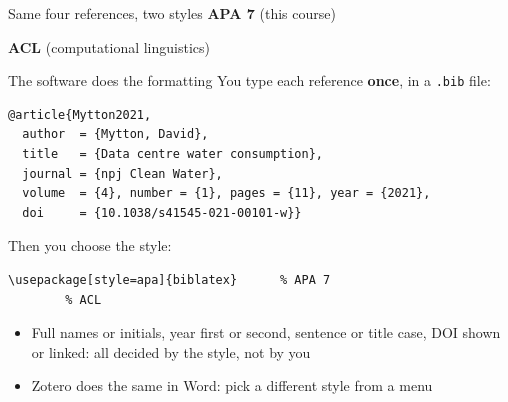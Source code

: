 \documentclass[aspectratio=169]{beamer}
\begin{document}
\begin{frame}{Same four references, two styles}
\footnotesize
\renewcommand*{\bibfont}{\footnotesize}
\setlength{\bibitemsep}{0.4ex}
\textbf{\small APA 7} {\small (this course)}
\begin{refsection}
  \nocite{Mytton2021,Reid:2024,writinghandbook,capek1936}
  \printbibliography[heading=none]
\end{refsection}

\vspace{1ex}
\textbf{\small ACL} {\small (computational linguistics)}
\begingroup
  \renewenvironment{thebibliography}[1]
    {\setlength{\parindent}{0pt}\setlength{\parskip}{0.4ex}}{\par}
  \renewcommand{\bibitem}[2][]{\par\hangindent=2em\hangafter=1}
  \renewcommand{\newblock}{}
  
\endgroup
\end{frame}

\begin{frame}[fragile]{The software does the formatting}
You type each reference \textbf{once}, in a \texttt{.bib} file:
\begin{verbatim}
@article{Mytton2021,
  author  = {Mytton, David},
  title   = {Data centre water consumption},
  journal = {npj Clean Water},
  volume  = {4}, number = {1}, pages = {11}, year = {2021},
  doi     = {10.1038/s41545-021-00101-w}}
\end{verbatim}
Then you choose the style:
\begin{verbatim}
\usepackage[style=apa]{biblatex}      % APA 7
        % ACL
\end{verbatim}
\begin{itemize}
  \item Full names or initials, year first or second, sentence or title case,
    DOI shown or linked: all decided by the style, not by you
  \item Zotero does the same in Word: pick a different style from a menu
\end{itemize}
\end{frame}
\end{document}
